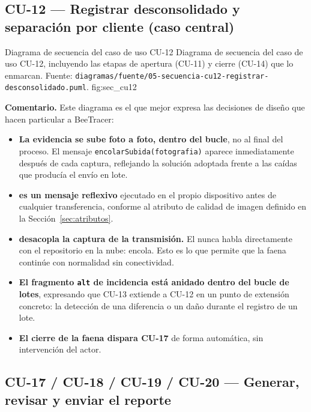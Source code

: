 \subsection{CU-12 --- Registrar desconsolidado y separación por cliente (caso central)}
\label{subsec:sec_cu12}

{Diagrama de secuencia del caso de uso CU-12}
{Diagrama de secuencia del caso de uso CU-12, incluyendo las etapas de apertura (CU-11) y cierre
(CU-14) que lo enmarcan. Fuente:
\texttt{diagramas/fuente/05-secuencia-cu12-registrar-desconsolidado.puml}.}
{fig:sec_cu12}

\textbf{Comentario.} Este diagrama es el que mejor expresa las decisiones de diseño que hacen
particular a BeeTracer:

\begin{itemize}
    \item \textbf{La evidencia se sube foto a foto, dentro del bucle}, no al final del proceso. El
          mensaje \texttt{encolarSubida(fotografia)} aparece inmediatamente después de cada
          captura, reflejando la solución adoptada frente a las caídas que producía el envío en
          lote.
    \item \textbf{ es un mensaje reflexivo} ejecutado en el propio
          dispositivo antes de cualquier transferencia, conforme al atributo de calidad de imagen
          definido en la Sección~\ref{sec:atributos}.
    \item \textbf{ desacopla la captura de la transmisión.} El
           nunca habla directamente con el repositorio en la nube: encola. Esto
          es lo que permite que la faena continúe con normalidad sin conectividad.
    \item \textbf{El fragmento \texttt{alt} de incidencia está anidado dentro del bucle de lotes},
          expresando que CU-13 extiende a CU-12 en un punto de extensión concreto: la detección de
          una diferencia o un daño durante el registro de un lote.
    \item \textbf{El cierre de la faena dispara CU-17} de forma automática, sin intervención del
          actor.
\end{itemize}

\subsection{CU-17 / CU-18 / CU-19 / CU-20 --- Generar, revisar y enviar el reporte}
\label{subsec:sec_reporte}


